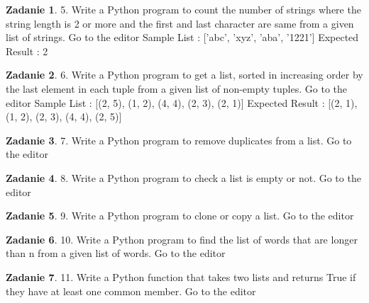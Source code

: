 \documentclass[11pt]{article}
\theoremstyle{definition}
\newtheorem{zadanie}{Zadanie}
\begin{document}
\begin{zadanie}


5. Write a Python program to count the number of strings where the string length is 2 or more and the first and last character are same from a given list of strings. Go to the editor
Sample List : ['abc', 'xyz', 'aba', '1221']
Expected Result : 2


\end{zadanie}

\begin{zadanie}


6. Write a Python program to get a list, sorted in increasing order by the last element in each tuple from a given list of non-empty tuples. Go to the editor
Sample List : [(2, 5), (1, 2), (4, 4), (2, 3), (2, 1)]
Expected Result : [(2, 1), (1, 2), (2, 3), (4, 4), (2, 5)]


\end{zadanie}

\begin{zadanie}


7. Write a Python program to remove duplicates from a list. Go to the editor


\end{zadanie}

\begin{zadanie}


8. Write a Python program to check a list is empty or not. Go to the editor


\end{zadanie}

\begin{zadanie}


9. Write a Python program to clone or copy a list. Go to the editor


\end{zadanie}

\begin{zadanie}


10. Write a Python program to find the list of words that are longer than n from a given list of words. Go to the editor


\end{zadanie}

\begin{zadanie}


11. Write a Python function that takes two lists and returns True if they have at least one common member. Go to the editor


\end{zadanie}
\end{document}
